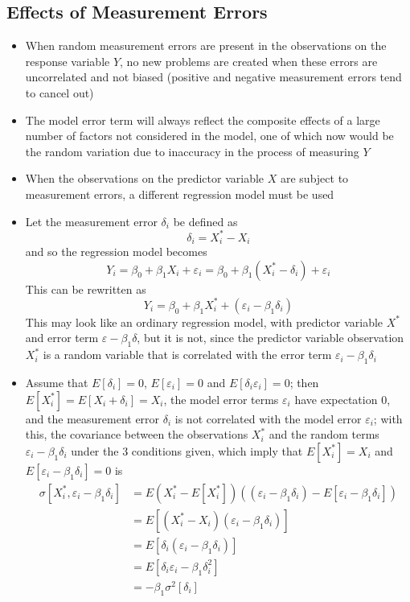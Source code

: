 \subsection{Effects of Measurement Errors} 
\begin{itemize}
\item When random measurement errors are present in the observations on the response variable $Y$, no new problems are created when these errors are uncorrelated and not biased (positive and negative measurement errors tend to cancel out)
\item The model error term will always reflect the composite effects of a large number of factors not considered in the model, one of which now would be the random variation due to inaccuracy in the process of measuring $Y$
\item When the observations on the predictor variable $X$ are subject to measurement errors, a different regression model must be used
\item Let the measurement error $\delta_i$ be defined as $$ \delta_i = X_i^* - X_i $$ and so the regression model becomes $$ Y_i = \beta_0 + \beta_1X_i + \varepsilon_i = \beta_0 + \beta_1(X_i^* - \delta_i) + \varepsilon_i $$ 
This can be rewritten as $$ Y_i = \beta_0 + \beta_1X_i^* + (\varepsilon_i - \beta_1\delta_i) $$ 
This may look like an ordinary regression model, with predictor variable $X^*$ and error term $\varepsilon - \beta_1\delta$, but it is not, since the predictor variable observation $X_i^*$ is a random variable that is correlated with the error term $\varepsilon_i - \beta_1\delta_i$ 
\item Assume that $E[\delta_i] = 0$, $E[\varepsilon_i] = 0$ and $E[\delta_i\varepsilon_i] = 0$; then $E[X_i^*] = E[X_i + \delta_i] = X_i$, the model error terms $\varepsilon_i$ have expectation $0$, and the measurement error $\delta_i$ is not correlated with the model error $\varepsilon_i$; with this, the covariance between the observations $X_i^*$ and the random terms $\varepsilon_i - \beta_1\delta_i$ under the 3 conditions given, which imply that $E[X_i^*] = X_i$ and $E[\varepsilon_i - \beta_1\delta_i] = 0$ is $$ \begin{aligned} \sigma[X_i^*, \varepsilon_i - \beta_1\delta_i] &= E{(X_i^* - E[X_i^*])((\varepsilon_i - \beta_1\delta_i) - E[\varepsilon_i - \beta_1\delta_i])} \\ &= E[(X_i^* - X_i)(\varepsilon_i - \beta_1\delta_i)] \\ &= E[\delta_i(\varepsilon_i - \beta_1\delta_i)] \\ &= E[\delta_i\varepsilon_i - \beta_1\delta_i^2] \\ &= -\beta_1\sigma^2[\delta_i] \end{aligned} $$ 

\end{itemize}
